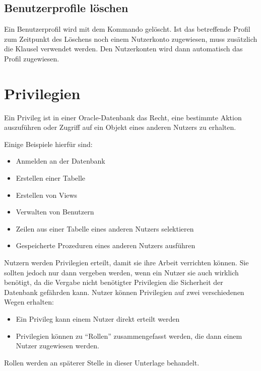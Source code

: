       \subsection{Benutzerprofile löschen}
        Ein Benutzerprofil wird mit dem Kommando  gelöscht. Ist das betreffende Profil zum Zeitpunkt des Löschens noch einem Nutzerkonto zugewiesen, muss zusätzlich die Klausel  verwendet werden. Den Nutzerkonten wird dann automatisch das Profil  zugewiesen.
        \begin{literaturinternet}
          \item \cite{i1006575}
        \end{literaturinternet}
    \section{Privilegien}
      \begin{merke}
        Ein Privileg ist in einer Oracle-Datenbank das Recht, eine bestimmte
        Aktion auszuführen oder Zugriff auf ein Objekt eines anderen
        Nutzers zu erhalten.
      \end{merke}
      Einige Beispiele hierfür sind:
      \begin{itemize}
        \item Anmelden an der Datenbank
        \item Erstellen einer Tabelle
        \item Erstellen von Views
        \item Verwalten von Benutzern
        \item Zeilen aus einer Tabelle eines anderen Nutzers selektieren
        \item Gespeicherte Prozeduren eines anderen Nutzers ausführen
      \end{itemize}
      Nutzern werden  Privilegien erteilt, damit sie ihre Arbeit verrichten
      können. Sie sollten jedoch nur dann vergeben werden, wenn ein Nutzer sie
      auch wirklich benötigt, da die Vergabe nicht benötigter Privilegien
      die Sicherheit der Datenbank gefährden kann.
\clearpage      
      Nutzer können Privilegien auf zwei verschiedenen Wegen erhalten:
      \begin{itemize}
        \item Ein Privileg kann einem Nutzer direkt erteilt werden
        \item Privilegien können zu \enquote{Rollen} zusammengefasst werden, die dann einem Nutzer zugewiesen werden.
      \end{itemize}
      Rollen werden an späterer Stelle in dieser Unterlage behandelt.
